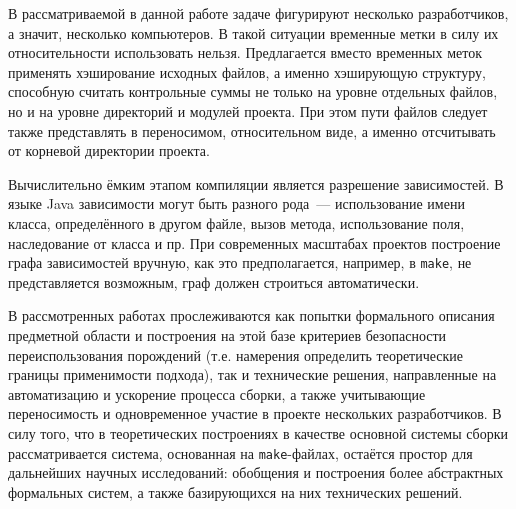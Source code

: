 В рассматриваемой в данной работе задаче фигурируют несколько разработчиков, а значит, несколько компьютеров. В такой ситуации временные метки в силу их относительности использовать нельзя. Предлагается вместо временных меток применять хэширование исходных файлов, а именно хэширующую структуру, способную считать контрольные суммы не только на уровне отдельных файлов, но и на уровне директорий и модулей проекта. При этом пути файлов следует также представлять в переносимом, относительном виде, а именно отсчитывать от корневой директории проекта.

Вычислительно ёмким этапом компиляции является разрешение зависимостей. В языке Java зависимости могут быть разного рода~--- использование имени класса, определённого в другом файле, вызов метода, использование поля, наследование от класса и пр. При современных масштабах проектов построение графа зависимостей вручную, как это предполагается, например, в \texttt{make}, не представляется возможным, граф должен строиться автоматически.

В рассмотренных работах прослеживаются как попытки формального описания предметной области и построения на этой базе критериев безопасности переиспользования порождений (т.е. намерения определить теоретические границы применимости подхода), так и технические решения, направленные на автоматизацию и ускорение процесса сборки, а также учитывающие переносимость и одновременное участие в проекте нескольких разработчиков. В силу того, что в теоретических построениях в качестве основной системы сборки рассматривается система, основанная на \texttt{make}-файлах, остаётся простор для дальнейших научных исследований: обобщения и построения более абстрактных формальных систем, а также базирующихся на них технических решений.
